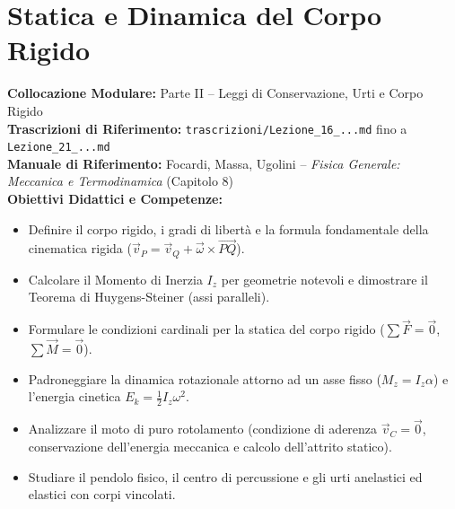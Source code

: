 \chapter{Statica e Dinamica del Corpo Rigido}
\label{chap:dinamica_statica_corpo_rigido}

\begin{tcolorbox}[enhanced, breakable, colback=navyblue!4!white, colframe=navyblue!80!black,
    coltitle=white, fonttitle=\bfseries\sffamily, title={Quadro Sinottico del Capitolo 08 (Corrispondenza: Lezioni 16, 17, 18, 19, 20 e 21)},
    sharp corners, rounded corners=south, boxrule=1pt]
\textbf{Collocazione Modulare:} Parte II -- Leggi di Conservazione, Urti e Corpo Rigido\\
\textbf{Trascrizioni di Riferimento:} \texttt{trascrizioni/Lezione\_16\_...md} fino a \texttt{Lezione\_21\_...md}\\
\textbf{Manuale di Riferimento:} Focardi, Massa, Ugolini -- \emph{Fisica Generale: Meccanica e Termodinamica} (Capitolo 8)\\
\textbf{Obiettivi Didattici e Competenze:}\par
\begin{itemize}
    \item Definire il corpo rigido, i gradi di libertà e la formula fondamentale della cinematica rigida ($\vec{v}_P = \vec{v}_Q + \vec{\omega}\times\vec{PQ}$).
    \item Calcolare il Momento di Inerzia $I_z$ per geometrie notevoli e dimostrare il Teorema di Huygens-Steiner (assi paralleli).
    \item Formulare le condizioni cardinali per la statica del corpo rigido ($\sum\vec{F} = \vec{0}$, $\sum\vec{M} = \vec{0}$).
    \item Padroneggiare la dinamica rotazionale attorno ad un asse fisso ($M_z = I_z \alpha$) e l'energia cinetica $E_k = \frac{1}{2}I_z\omega^2$.
    \item Analizzare il moto di puro rotolamento (condizione di aderenza $\vec{v}_C = \vec{0}$, conservazione dell'energia meccanica e calcolo dell'attrito statico).
    \item Studiare il pendolo fisico, il centro di percussione e gli urti anelastici ed elastici con corpi vincolati.
\end{itemize}
\end{tcolorbox}

